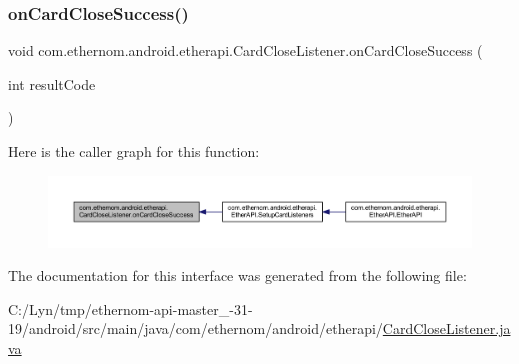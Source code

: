 \mbox{\label{interfacecom_1_1ethernom_1_1android_1_1etherapi_1_1_card_close_listener_a6fff42211bd62d755d223e49e509ec63}} 
\subsubsection{\texorpdfstring{on\+Card\+Close\+Success()}{onCardCloseSuccess()}}
{\footnotesize\ttfamily void com.\+ethernom.\+android.\+etherapi.\+Card\+Close\+Listener.\+on\+Card\+Close\+Success (\begin{DoxyParamCaption}\item[{int}]{result\+Code }\end{DoxyParamCaption})}

Here is the caller graph for this function\+:\nopagebreak
\begin{figure}[H]
\begin{center}
\leavevmode
\includegraphics[width=350pt]{interfacecom_1_1ethernom_1_1android_1_1etherapi_1_1_card_close_listener_a6fff42211bd62d755d223e49e509ec63_icgraph}
\end{center}
\end{figure}


The documentation for this interface was generated from the following file\+:\begin{DoxyCompactItemize}
\item 
C\+:/\+Lyn/tmp/ethernom-\/api-\/master\+\_-\/31-\/19/android/src/main/java/com/ethernom/android/etherapi/\mbox{\hyperlink{_card_close_listener_8java}{Card\+Close\+Listener.\+java}}\end{DoxyCompactItemize}
